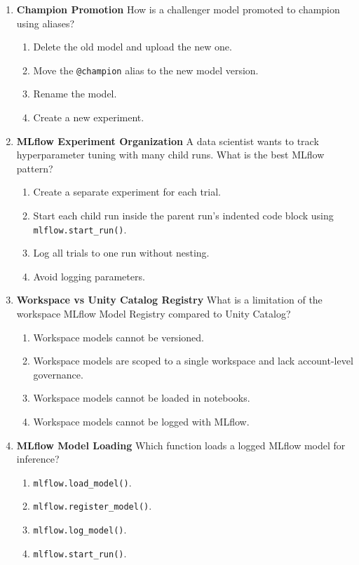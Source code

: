 \documentclass{article}
\begin{document}
\begin{enumerate}[label=\textbf{Q\arabic*.}]
		\item \textbf{Champion Promotion}
		How is a challenger model promoted to champion using aliases?
		\begin{enumerate}[label=\Alph*.]
			\item Delete the old model and upload the new one.
			\item Move the \texttt{@champion} alias to the new model version.
			\item Rename the model.
			\item Create a new experiment.
		\end{enumerate}
		
		\item \textbf{MLflow Experiment Organization}
		A data scientist wants to track hyperparameter tuning with many child runs. What is the best MLflow pattern?
		\begin{enumerate}[label=\Alph*.]
			\item Create a separate experiment for each trial.
			\item Start each child run inside the parent run's indented code block using \texttt{mlflow.start\_run()}.
			\item Log all trials to one run without nesting.
			\item Avoid logging parameters.
		\end{enumerate}
		
		\item \textbf{Workspace vs Unity Catalog Registry}
		What is a limitation of the workspace MLflow Model Registry compared to Unity Catalog?
		\begin{enumerate}[label=\Alph*.]
			\item Workspace models cannot be versioned.
			\item Workspace models are scoped to a single workspace and lack account-level governance.
			\item Workspace models cannot be loaded in notebooks.
			\item Workspace models cannot be logged with MLflow.
		\end{enumerate}
		
		\item \textbf{MLflow Model Loading}
		Which function loads a logged MLflow model for inference?
		\begin{enumerate}[label=\Alph*.]
			\item \texttt{mlflow.load\_model()}.
			\item \texttt{mlflow.register\_model()}.
			\item \texttt{mlflow.log\_model()}.
			\item \texttt{mlflow.start\_run()}.
		\end{enumerate}
		

\end{enumerate}
\end{document}

